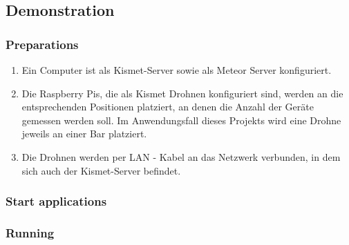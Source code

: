 \documentclass[a4paper]{spie}  %
\begin{document}
\subsection{Demonstration} %
\subsubsection{Preparations}
\begin{enumerate}
 \item Ein Computer ist als Kismet-Server sowie als Meteor Server konfiguriert.
 \item Die Raspberry Pis, die als Kismet Drohnen konfiguriert sind, werden an die entsprechenden Positionen platziert, an denen die Anzahl der Geräte gemessen werden soll. Im Anwendungsfall dieses Projekts wird eine Drohne jeweils an einer Bar platziert.
 \item Die Drohnen werden per LAN - Kabel an das Netzwerk verbunden, in dem sich auch der Kismet-Server befindet.
\end{enumerate}
\subsubsection{Start applications}

\subsubsection{Running}
\end{document}
